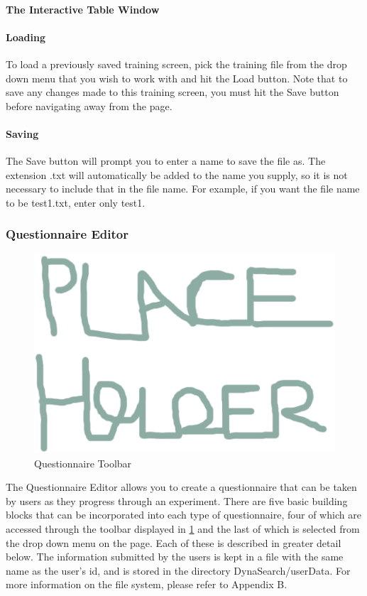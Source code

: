 \documentclass[article]{ij4uq}              %
\begin{document}
\paragraph{The Interactive Table Window}

\paragraph{Loading}
To load a previously saved training screen, pick the training file from the drop down menu that you wish to work with and hit the Load button. Note that to save any changes made to this training screen, you must hit the Save button before navigating away from the page.

\paragraph{Saving}
The Save button will prompt you to enter a name to save the file as. The extension .txt will automatically be added to the name you supply, so it is not necessary to include that in the file name. For example, if you want the file name to be test1.txt, enter only test1.

\subsubsection {Questionnaire Editor}

\begin{figure}[h!]
 \centering
 \includegraphics[width=5.0in]{figures/place.eps}
 \caption{Questionnaire Toolbar}
 \label{fig:questTool}
\end{figure}
\FloatBarrier

The Questionnaire Editor allows you to create a questionnaire that can be taken by users as they progress through an experiment. There are five basic building blocks that can be incorporated into each type of questionnaire, four of which are accessed through the toolbar displayed in \ref{fig:questTool} and the last of which is selected from the drop down menu on the page. Each of these is described in greater detail below. 
The information submitted by the users is kept in a file with the same name as the user's id, and is stored in the directory DynaSearch/userData. For more information on the file system, please refer to Appendix B.
\end{document}
